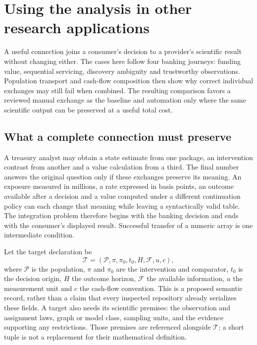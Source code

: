 \chapter{Using the analysis in other research applications}
\label{in:consumers}
\label{exec13:i3-start}

A useful connection joins a consumer's decision to a provider's scientific result without changing either. The cases here follow four banking journeys: funding value, sequential servicing, discovery ambiguity and trustworthy observations. Population transport and cash-flow composition then show why correct individual exchanges may still fail when combined. The resulting comparison favors a reviewed manual exchange as the baseline and automation only where the same scientific output can be preserved at a useful total cost.


\section{What a complete connection must preserve}

A treasury analyst may obtain a state estimate from one package, an intervention
contrast from another and a value calculation from a third. The final number
answers the original question only if these exchanges preserve its meaning.
An exposure measured in millions, a rate expressed in basis points, an outcome
available after a decision and a value computed under a different continuation
policy can each change that meaning while leaving a syntactically valid table.
The integration problem therefore begins with the banking decision and ends
with the consumer's displayed result. Successful transfer of a numeric array
is one intermediate condition.

Let the target declaration be
\[
 \mathcal T=(\mathcal P,\pi,\pi_0,t_0,H,\mathcal F,u,c),
\]
where $\mathcal P$ is the population, $\pi$ and $\pi_0$ are the intervention
and comparator, $t_0$ is the decision origin, $H$ the outcome horizon,
$\mathcal F$ the available information, $u$ the measurement unit and $c$ the
cash-flow convention. This is a proposed semantic record, rather than a claim
that every inspected repository already serializes these fields. A target also
needs its scientific premises: the observation and assignment laws, graph or
model class, sampling units, and the evidence supporting any restrictions.
Those premises are referenced alongside $\mathcal T$; a short tuple is not a
replacement for their mathematical definition.

